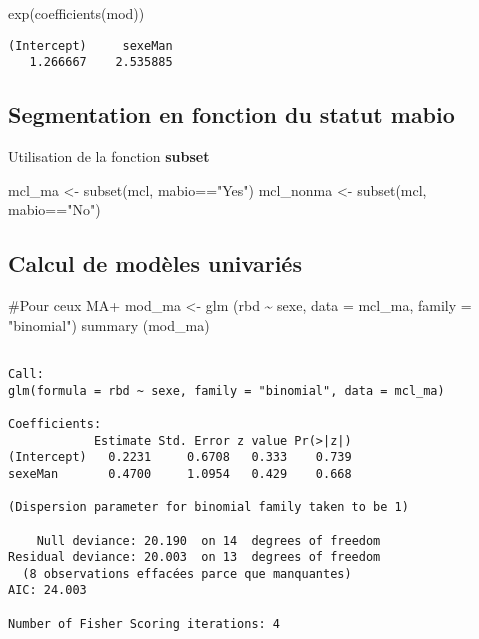 \documentclass[
  letterpaper,
  DIV=11,
  numbers=noendperiod]{scrartcl}
\newenvironment{Shaded}{\begin{snugshade}}{\end{snugshade}}
\newcommand{\AttributeTok}[1]{\textcolor[rgb]{0.40,0.45,0.13}{#1}}
\newcommand{\CommentTok}[1]{\textcolor[rgb]{0.37,0.37,0.37}{#1}}
\newcommand{\FunctionTok}[1]{\textcolor[rgb]{0.28,0.35,0.67}{#1}}
\newcommand{\NormalTok}[1]{\textcolor[rgb]{0.00,0.23,0.31}{#1}}
\newcommand{\OtherTok}[1]{\textcolor[rgb]{0.00,0.23,0.31}{#1}}
\newcommand{\SpecialCharTok}[1]{\textcolor[rgb]{0.37,0.37,0.37}{#1}}
\newcommand{\StringTok}[1]{\textcolor[rgb]{0.13,0.47,0.30}{#1}}
\begin{document}
\begin{Shaded}
\begin{Highlighting}[]
\FunctionTok{exp}\NormalTok{(}\FunctionTok{coefficients}\NormalTok{(mod))}
\end{Highlighting}
\end{Shaded}

\begin{verbatim}
(Intercept)     sexeMan 
   1.266667    2.535885 
\end{verbatim}

\hypertarget{segmentation-en-fonction-du-statut-mabio}{%
\subsection{Segmentation en fonction du statut
mabio}\label{segmentation-en-fonction-du-statut-mabio}}

Utilisation de la fonction \textbf{subset}

\begin{Shaded}
\begin{Highlighting}[]
\NormalTok{mcl\_ma }\OtherTok{\textless{}{-}} \FunctionTok{subset}\NormalTok{(mcl, mabio}\SpecialCharTok{==}\StringTok{"Yes"}\NormalTok{)}
\NormalTok{mcl\_nonma }\OtherTok{\textless{}{-}} \FunctionTok{subset}\NormalTok{(mcl, mabio}\SpecialCharTok{==}\StringTok{"No"}\NormalTok{)}
\end{Highlighting}
\end{Shaded}

\hypertarget{calcul-de-moduxe8les-univariuxe9s}{%
\subsection{Calcul de modèles
univariés}\label{calcul-de-moduxe8les-univariuxe9s}}

\begin{Shaded}
\begin{Highlighting}[]
\CommentTok{\#Pour ceux MA+}
\NormalTok{mod\_ma }\OtherTok{\textless{}{-}} \FunctionTok{glm}\NormalTok{ (rbd }\SpecialCharTok{\textasciitilde{}}\NormalTok{ sexe, }\AttributeTok{data =}\NormalTok{ mcl\_ma, }\AttributeTok{family =} \StringTok{"binomial"}\NormalTok{)}
\FunctionTok{summary}\NormalTok{ (mod\_ma)}
\end{Highlighting}
\end{Shaded}

\begin{verbatim}

Call:
glm(formula = rbd ~ sexe, family = "binomial", data = mcl_ma)

Coefficients:
            Estimate Std. Error z value Pr(>|z|)
(Intercept)   0.2231     0.6708   0.333    0.739
sexeMan       0.4700     1.0954   0.429    0.668

(Dispersion parameter for binomial family taken to be 1)

    Null deviance: 20.190  on 14  degrees of freedom
Residual deviance: 20.003  on 13  degrees of freedom
  (8 observations effacées parce que manquantes)
AIC: 24.003

Number of Fisher Scoring iterations: 4
\end{verbatim}
\end{document}

